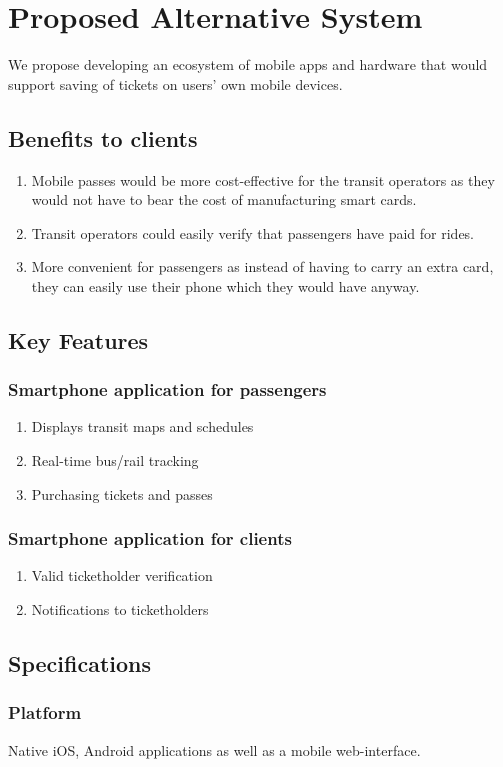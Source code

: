 \documentclass{article}
\begin{document}
\section{Proposed Alternative System}
	We propose developing an ecosystem of mobile apps and hardware that would support saving of tickets on users' own mobile devices.
	\subsection{Benefits to clients}
		\begin{enumerate}
			\item Mobile passes would be more cost-effective for the transit operators as they would not have to bear the cost of manufacturing smart cards.
			\item Transit operators could easily verify that passengers have paid for rides.
			\item More convenient for passengers as instead of having to carry an extra card, they can easily use their phone which they would have anyway.
		\end{enumerate}
	\subsection{Key Features}
		\subsubsection{Smartphone application for passengers}
			\begin{enumerate}
				\item Displays transit maps and schedules
				\item Real-time bus/rail tracking
				\item Purchasing tickets and passes
			\end{enumerate}
		\subsubsection{Smartphone application for clients}
			\begin{enumerate}
				\item Valid ticketholder verification
				\item Notifications to ticketholders
			\end{enumerate}
		\subsection{Specifications}
			\subsubsection{Platform}
				Native iOS, Android applications as well as a mobile web-interface.
\end{document}
